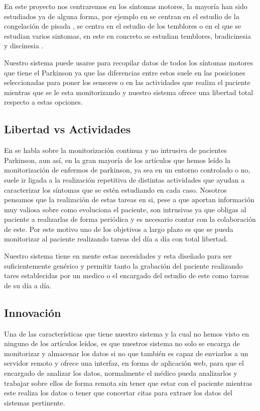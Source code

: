 \documentclass[11pt,spanish]{article}
\begin{document}
En este proyecto nos centraremos en los síntomas motores, la mayoría han sido estudiados ya de alguna forma, por ejemplo en \cite{resumen3} se centran en el estudio de la congelación de pisada \cite{gait}, \cite{resumen5} se centra en el estudio de los temblores o \cite{resumen4} en el que se estudian varios sintomas, en este en concreto se estudian temblores, bradicinesia \cite{hipocinesia} y discinesia \cite{dyskinesia}.
\newline

Nuestro sistema puede usarse para recopilar datos de todos los síntomas motores que tiene el Parkinson ya que las diferencias entre estos suele en las posiciones seleccionadas para poner los sensores o en las actividades que realiza el paciente mientras que se le esta monitorizando y nuestro sistema ofrece una libertad total respecto a estas opciones.

\subsection{Libertad vs Actividades}

En \cite{resumen2} se habla sobre la monitorización continua y no intrusiva de pacientes Parkinson, aun así, en la gran mayoría de los artículos que hemos leído la monitorización de enfermos de parkinson, ya sea en un entorno controlado o no, suele ir ligada a la realización repetitiva de distintas actividades que ayudan a caracterizar los síntomas que se estén estudiando en cada caso. Nosotros pensamos que la realización de estas tareas en si, pese a que aportan información muy valiosa sobre como evoluciona el paciente, son intrusivas ya que obligas al paciente a realizarlas de forma periódica y es necesario contar con la colaboración de este. Por este motivo uno de los objetivos a largo plazo es que se pueda monitorizar al paciente realizando tareas del día a día con total libertad.
\newline

Nuestro sistema tiene en mente estas necesidades y esta diseñado para ser suficientemente genérico y permitir tanto la grabación del paciente realizando tares establecidas por un medico o el encargado del estudio de este como tareas de su día a día.

\subsection{Innovación}

Una de las características que tiene nuestro sistema y la cual no hemos visto en ninguno de los artículos leídos, es que nuestros sistema no solo se encarga de monitorizar y almacenar los datos si no que también es capaz de enviarlos a un servidor remoto y ofrece una interfaz, en forma de aplicación web, para que el encargado de analizar los datos, normalmente el médico pueda analizarlos y trabajar sobre ellos de forma remota sin tener que estar con el paciente mientras este realiza los datos o tener que concertar citas para extraer los datos del sistemas pertinente.
\newline
\end{document}
